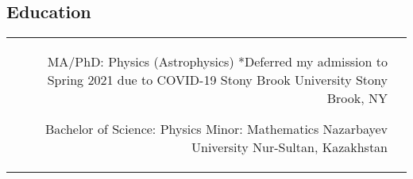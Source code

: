 \documentclass[10pt]{article} %
\begin{document}
\begin{paracol}{1}



\section{Education} 





\begin{supertabular}{rl} %

	
	
	
	{MA/PhD:} %
	{Physics (Astrophysics)} %
	{*Deferred my admission to Spring 2021 due to COVID-19} %
	{Stony Brook University} %
	{Stony Brook, NY}
	
	
	{Bachelor of Science:} %
	{Physics} %
	{Minor: Mathematics} %
	{Nazarbayev University} %
	{Nur-Sultan, Kazakhstan}
	

\end{supertabular}


\end{paracol}
\end{document}
